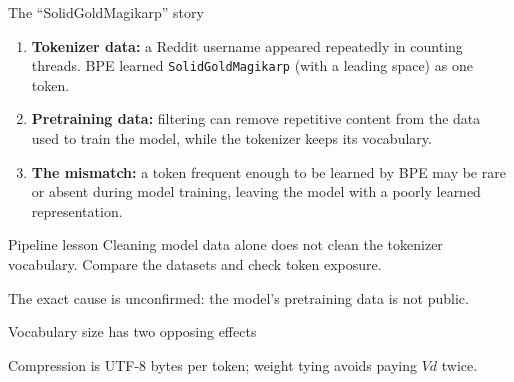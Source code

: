 \documentclass[handout]{beamer}
\begin{document}
\begin{frame}{The ``SolidGoldMagikarp'' story}
  \small
  \begin{enumerate}
      \setlength{\itemsep}{4pt}
    \item \textbf{Tokenizer data:} a Reddit username appeared repeatedly in counting threads. BPE learned \texttt{SolidGoldMagikarp} (with a leading space) as one token.
    \item \textbf{Pretraining data:} filtering can remove repetitive content from the data used to train the model, while the tokenizer keeps its vocabulary.
    \item \textbf{The mismatch:} a token frequent enough to be learned by BPE may be rare or absent during model training, leaving the model with a poorly learned representation.
  \end{enumerate}
  \begin{alertblock}{Pipeline lesson}
    Cleaning model data alone does not clean the tokenizer vocabulary. Compare the datasets and check token exposure.
  \end{alertblock}
  \footnotesize The exact cause is unconfirmed: the model's pretraining data is not public.
\end{frame}

\begin{frame}{Vocabulary size has two opposing effects}
  \centering
  \par\vspace{10pt}
  \small Compression is UTF-8 bytes per token; weight tying avoids paying $Vd$ twice.
\end{frame}
\end{document}
